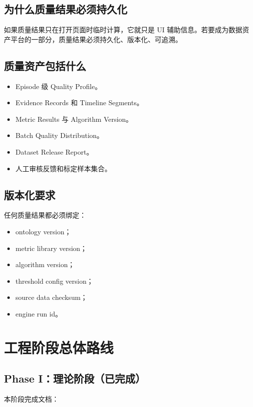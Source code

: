 \documentclass[UTF8,zihao=-4,oneside,openany]{ctexrep}
\begin{document}
\subsection{为什么质量结果必须持久化}

如果质量结果只在打开页面时临时计算，它就只是 UI 辅助信息。若要成为数据资产平台的一部分，质量结果必须持久化、版本化、可追溯。

\subsection{质量资产包括什么}

\begin{itemize}
\item Episode 级 Quality Profile。
\item Evidence Records 和 Timeline Segments。
\item Metric Results 与 Algorithm Version。
\item Batch Quality Distribution。
\item Dataset Release Report。
\item 人工审核反馈和标定样本集合。
\end{itemize}

\subsection{版本化要求}

任何质量结果都必须绑定：

\begin{itemize}
\item ontology version；
\item metric library version；
\item algorithm version；
\item threshold config version；
\item source data checksum；
\item engine run id。
\end{itemize}

\section{工程阶段总体路线}

\subsection{Phase I：理论阶段（已完成）}

本阶段完成文档：
\end{document}
